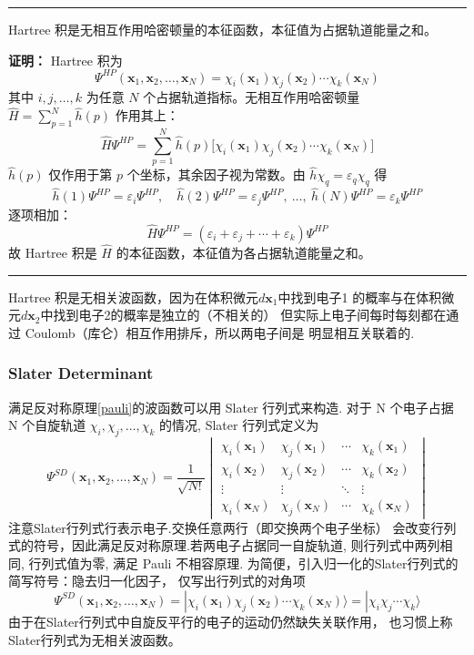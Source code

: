 \documentclass[fontset=none,12pt,a4paper]{ctexart}
\numberwithin{equation}{section}
\begin{document}
\vspace{1em}
\noindent\rule{\linewidth}{0.4pt}

Hartree 积是无相互作用哈密顿量的本征函数，本征值为占据轨道能量之和。

\textbf{证明：} Hartree 积为
\[
  \Psi^{HP}(\mathbf{x}_1, \mathbf{x}_2, \ldots, \mathbf{x}_N) = \chi_i(\mathbf{x}_1) \chi_j(\mathbf{x}_2) \cdots \chi_k(\mathbf{x}_N)
\]
其中 $i, j, \ldots, k$ 为任意 $N$ 个占据轨道指标。无相互作用哈密顿量 $\hat{H} = \sum_{p=1}^N \hat{h}(p)$ 作用其上：
\[
  \hat{H} \Psi^{HP} = \sum_{p=1}^N \hat{h}(p) \bigl[ \chi_i(\mathbf{x}_1) \chi_j(\mathbf{x}_2) \cdots \chi_k(\mathbf{x}_N) \bigr]
\]
$\hat{h}(p)$ 仅作用于第 $p$ 个坐标，其余因子视为常数。由 $\hat{h} \chi_q = \varepsilon_q \chi_q$ 得
\[
  \hat{h}(1) \Psi^{HP} = \varepsilon_i \Psi^{HP},\quad
  \hat{h}(2) \Psi^{HP} = \varepsilon_j \Psi^{HP},\ \ldots,\ 
  \hat{h}(N) \Psi^{HP} = \varepsilon_k \Psi^{HP}
\]
逐项相加：
\[
  \hat{H} \Psi^{HP}
  = (\varepsilon_i + \varepsilon_j + \cdots + \varepsilon_k) \Psi^{HP}
\]
故 Hartree 积是 $\hat{H}$ 的本征函数，本征值为各占据轨道能量之和。

\noindent\rule{\linewidth}{0.4pt}
\vspace{1em}

Hartree 积是无相关波函数，因为在体积微元$d\mathbf{x}_1$中找到电子1 
的概率与在体积微元$d\mathbf{x}_2$中找到电子2的概率是独立的（不相关的）
但实际上电子间每时每刻都在通过 Coulomb（库仑）相互作用排斥，所以两电子间是
明显相互关联着的.
\subsubsection{Slater Determinant}
满足反对称原理\eqref{pauli}的波函数可以用 Slater 行列式来构造.
对于 N 个电子占据 N 个自旋轨道 $\chi_i, \chi_j, \ldots, \chi_k$ 的情况, Slater 行列式定义为
\begin{equation}
  \Psi^{SD}(\mathbf{x}_1, \mathbf{x}_2, \ldots, \mathbf{x}_N) = \frac{1}{\sqrt{N!}}
  \begin{vmatrix}
    \chi_i(\mathbf{x}_1) & \chi_j(\mathbf{x}_1) & \cdots & \chi_k(\mathbf{x}_1) \\
    \chi_i(\mathbf{x}_2) & \chi_j(\mathbf{x}_2) & \cdots & \chi_k(\mathbf{x}_2) \\
    \vdots & \vdots & \ddots & \vdots \\
    \chi_i(\mathbf{x}_N) & \chi_j(\mathbf{x}_N) & \cdots & \chi_k(\mathbf{x}_N)
  \end{vmatrix}
\end{equation}
注意Slater行列式行表示电子.交换任意两行（即交换两个电子坐标）
会改变行列式的符号，因此满足反对称原理.若两电子占据同一自旋轨道,
 则行列式中两列相同, 行列式值为零, 满足 Pauli 不相容原理.
 为简便，引入归一化的Slater行列式的简写符号：隐去归一化因子，
 仅写出行列式的对角项
\begin{equation}
\Psi^{SD}(\mathbf{x}_1, \mathbf{x}_2, \ldots, \mathbf{x}_N) 
= |\chi_i (\mathbf{x}_1) \chi_j (\mathbf{x}_2) \cdots \chi_k (\mathbf{x}_N) \rangle
=|\chi_i \chi_j \cdots \chi_k \rangle
\end{equation}
由于在Slater行列式中自旋反平行的电子的运动仍然缺失关联作用，
也习惯上称Slater行列式为无相关波函数。
\end{document}
